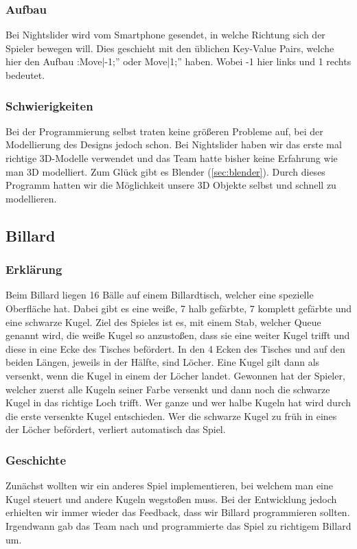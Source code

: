\subsubsection{Aufbau}
Bei Nightslider wird vom Smartphone gesendet, in welche Richtung sich der Spieler bewegen will. Dies geschieht mit den üblichen Key-Value Pairs, welche hier den Aufbau :Move|-1;” oder Move|1;” haben. Wobei -1 hier links und 1 rechts bedeutet.
\subsubsection{Schwierigkeiten}
Bei der Programmierung selbst traten keine größeren Probleme auf, bei der Modellierung des Designs jedoch schon. Bei Nightslider haben wir das erste mal richtige 3D-Modelle verwendet und das Team hatte bisher keine Erfahrung wie man 3D modelliert. Zum Glück gibt es Blender (\ref{sec:blender}). Durch dieses Programm hatten wir die Möglichkeit unsere 3D Objekte selbst und schnell zu modellieren.
\subsection{Billard}
\subsubsection{Erklärung}
Beim Billard liegen 16 Bälle auf einem Billardtisch, welcher eine spezielle Oberfläche hat. Dabei gibt es eine weiße, 7 halb gefärbte, 7 komplett gefärbte und eine schwarze Kugel. Ziel des Spieles ist es, mit einem Stab, welcher Queue genannt wird, die weiße Kugel so anzustoßen, dass sie eine weiter Kugel trifft und diese in eine Ecke des Tisches befördert. In den 4 Ecken des Tisches und auf den beiden Längen, jeweils in der Hälfte, sind Löcher. Eine Kugel gilt dann als versenkt, wenn die Kugel in einem der Löcher landet. Gewonnen hat der Spieler, welcher zuerst alle Kugeln seiner Farbe versenkt und dann noch die schwarze Kugel in das richtige Loch trifft. Wer ganze und wer halbe Kugeln hat wird durch die erste versenkte Kugel entschieden. Wer die schwarze Kugel zu früh in eines der Löcher befördert, verliert automatisch das Spiel.
\subsubsection{Geschichte}
Zunächst wollten wir ein anderes Spiel implementieren, bei welchem man eine Kugel steuert und andere Kugeln wegstoßen muss. Bei der Entwicklung jedoch erhielten wir immer wieder das Feedback, dass wir Billard programmieren sollten. Irgendwann gab das Team nach und programmierte das Spiel zu richtigem Billard um.
